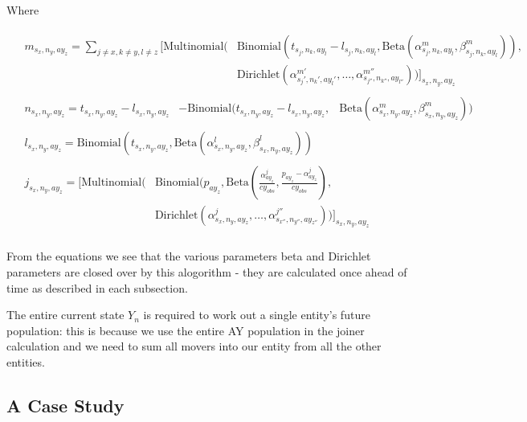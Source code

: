 \documentclass[margin=5mm]{article}
\begin{document}
Where

\begin{equation*}
\begin{aligned}
& \begin{split}
    m_{s_x,n_y,ay_z} = \sum_{j \neq x, k \neq y , l \neq z }\bigg[
        \text{Multinomial}( & \text{Binomial}(t_{s_j,n_k,ay_l} - l_{s_j,n_k,ay_l}, 
        \text{Beta}(\alpha^m_{s_j,n_k,ay_l},\beta^m_{s_j,n_k,ay_l})),
        \\ &  \text{Dirichlet}(\alpha^{m'}_{s_j',n_k',ay_l'}, \dots,
        \alpha^{m''}_{s_{j''},n_{k''},ay_{l''}}))\bigg]_{s_x,n_y,ay_z}
\end{split}\\ 
& \begin{split}
    n_{s_x,n_y,ay_z} = t_{s_x,n_y,ay_z}  - l_{s_x,n_y,ay_z} & - \text{Binomial}(t_{s_x,n_y,ay_z} - l_{s_x,n_y,ay_z}, 
    & \text{Beta}(\alpha^m_{s_x,n_y,ay_z},\beta^m_{s_x,n_y,ay_z})) 
  \end{split}\\
& \begin{split}
  l_{s_x,n_y,ay_z} =
  \text{Binomial}(t_{s_x,n_y,ay_z},\text{Beta}(\alpha^l_{s_x,n_y,ay_z},
  \beta^l_{s_x,n_y,ay_z}))
\end{split}\\
& \begin{split}
j_{s_x,n_y,ay_z} = \bigg[\text{Multinomial}( & \text{Binomial}(p_{ay_z},
\text{Beta}(\frac{\alpha^j_{ay_z}}{cy_{obs}},\frac{p_{ay_z} -\alpha^j_{ay_z}}{cy_{obs}}), \\
& \text{Dirichlet}(\alpha^{j}_{s_x,n_y,ay_z}, \dots
, \alpha^{j''}_{s_{x''},n_{y''},ay_{z''}}))\bigg]_{s_x,n_y,ay_z}
\end{split}\\
\end{aligned}
\end{equation*}

From the equations we see that the various parameters beta and
Dirichlet parameters are closed over by this alogorithm - they are
calculated once ahead of time as described in each subsection.

The entire current state $Y_n$ is required to work out a single
entity's future population: this is because we use the entire AY
population in the joiner calculation and we need to sum all movers
into our entity from all the other entities.

\subsection{A Case Study}
\end{document}
